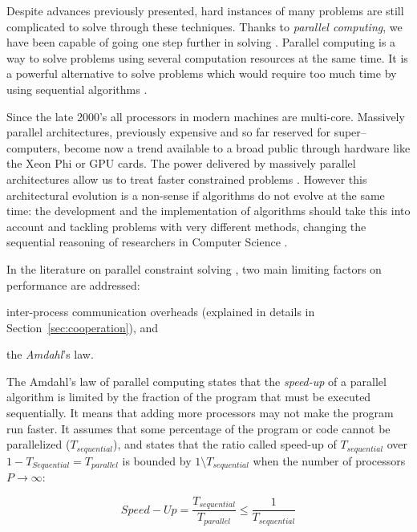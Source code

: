 Despite advances previously presented, hard instances of many problems are still complicated to solve through these techniques. Thanks to \textit{parallel computing}, we have been capable of going one step further in solving \csps. Parallel computing is a way to solve problems using several computation resources at the same time. It is a powerful alternative to solve problems which would require too much time by using sequential algorithms \cite{Grama2003}. %

Since the late 2000's all processors in modern machines are multi-core. Massively parallel architectures, previously expensive and so far reserved for super--computers, become now a trend available to a broad public through hardware like the Xeon Phi or GPU cards. The power delivered by massively parallel architectures allow us to treat faster constrained problems \cite{Borkar2007}. However this architectural evolution is a non-sense if algorithms do not evolve at the same time: the development and the implementation of algorithms should take this into account and tackling problems with very different methods, changing the sequential reasoning of researchers in Computer Science \cite{Hill2008, Sanders2014}. 

In the literature on parallel constraint solving \cite{Gent}, two main limiting factors on performance are addressed: \begin{inparaenum}[1-] \item inter-process communication overheads (explained in details in Section~\ref{sec:cooperation}), and \item the \textit{Amdahl}'s law. \end{inparaenum} The Amdahl's law of parallel computing states that the \textit{speed-up} of a parallel algorithm is limited by the fraction of the program that must be executed sequentially. It means that adding more processors may not make the program run faster. It assumes that some percentage of the program or code cannot be parallelized ($T_{sequential}$), and states that the ratio called speed-up of $T_{sequential}$ over $1 - T_{Sequential} = T_{parallel}$ is bounded by $1\setminus T_{sequential}$ when the number of processors $P \rightarrow \infty$:

\begin{equation}\label{amdahl}
Speed-Up = \frac{T_{sequential}}{T_{parallel}} \leq \frac{1}{T_{sequential}}
\end{equation}

